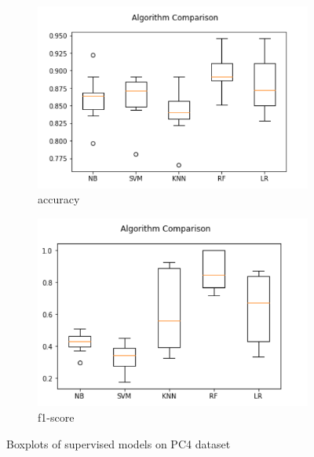 \begin{figure}[h!]
  \centering
  \begin{subfigure}[b]{0.4\linewidth}
    \includegraphics[width=\linewidth]{report/PC4.png}
    \caption{accuracy}
  \end{subfigure}
  \begin{subfigure}[b]{0.4\linewidth}
    \includegraphics[width=\linewidth]{report/PC4_f.png}
    \caption{f1-score}
  \end{subfigure}
  \caption{Boxplots of supervised models on PC4 dataset}
\end{figure}


